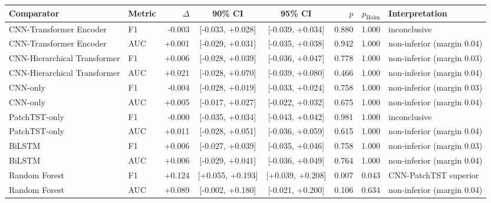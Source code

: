 \begin{tabular}{llrccrrl}
\toprule
Comparator & Metric & $\Delta$ & 90\% CI & 95\% CI & $p$ & $p_{\mathrm{Holm}}$ & Interpretation \\
\midrule
CNN-Transformer Encoder & F1 & -0.003 & [-0.033, +0.028] & [-0.039, +0.034] & 0.880 & 1.000 & inconclusive \\
CNN-Transformer Encoder & AUC & +0.001 & [-0.029, +0.031] & [-0.035, +0.038] & 0.942 & 1.000 & non-inferior (margin 0.04) \\
CNN-Hierarchical Transformer & F1 & +0.006 & [-0.028, +0.039] & [-0.036, +0.047] & 0.778 & 1.000 & non-inferior (margin 0.03) \\
CNN-Hierarchical Transformer & AUC & +0.021 & [-0.028, +0.070] & [-0.039, +0.080] & 0.466 & 1.000 & non-inferior (margin 0.04) \\
CNN-only & F1 & -0.004 & [-0.028, +0.019] & [-0.033, +0.024] & 0.758 & 1.000 & non-inferior (margin 0.03) \\
CNN-only & AUC & +0.005 & [-0.017, +0.027] & [-0.022, +0.032] & 0.675 & 1.000 & non-inferior (margin 0.04) \\
PatchTST-only & F1 & -0.000 & [-0.035, +0.034] & [-0.043, +0.042] & 0.981 & 1.000 & inconclusive \\
PatchTST-only & AUC & +0.011 & [-0.028, +0.051] & [-0.036, +0.059] & 0.615 & 1.000 & non-inferior (margin 0.04) \\
BiLSTM & F1 & +0.006 & [-0.027, +0.039] & [-0.035, +0.046] & 0.758 & 1.000 & non-inferior (margin 0.03) \\
BiLSTM & AUC & +0.006 & [-0.029, +0.041] & [-0.036, +0.049] & 0.764 & 1.000 & non-inferior (margin 0.04) \\
Random Forest & F1 & +0.124 & [+0.055, +0.193] & [+0.039, +0.208] & 0.007 & 0.043 & CNN-PatchTST superior \\
Random Forest & AUC & +0.089 & [-0.002, +0.180] & [-0.021, +0.200] & 0.106 & 0.634 & non-inferior (margin 0.04) \\
\bottomrule
\end{tabular}
